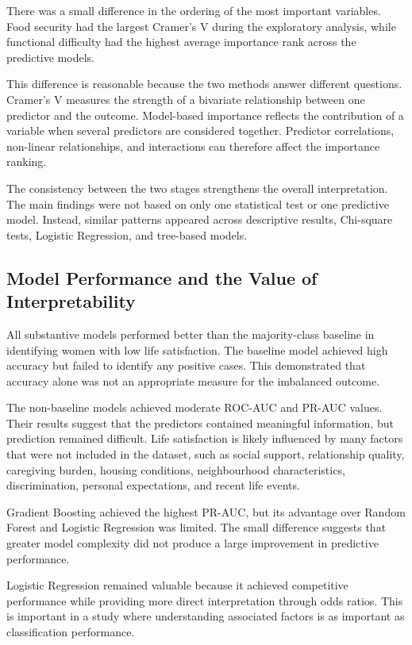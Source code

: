 \documentclass[12pt]{article}
\begin{document}
There was a small difference in the ordering of the most important variables. Food security had the largest Cramer's V during the exploratory analysis, while functional difficulty had the highest average importance rank across the predictive models.

This difference is reasonable because the two methods answer different questions. Cramer's V measures the strength of a bivariate relationship between one predictor and the outcome. Model-based importance reflects the contribution of a variable when several predictors are considered together. Predictor correlations, non-linear relationships, and interactions can therefore affect the importance ranking.

The consistency between the two stages strengthens the overall interpretation. The main findings were not based on only one statistical test or one predictive model. Instead, similar patterns appeared across descriptive results, Chi-square tests, Logistic Regression, and tree-based models.

\subsection{Model Performance and the Value of Interpretability}

All substantive models performed better than the majority-class baseline in identifying women with low life satisfaction. The baseline model achieved high accuracy but failed to identify any positive cases. This demonstrated that accuracy alone was not an appropriate measure for the imbalanced outcome.

The non-baseline models achieved moderate ROC-AUC and PR-AUC values. Their results suggest that the predictors contained meaningful information, but prediction remained difficult. Life satisfaction is likely influenced by many factors that were not included in the dataset, such as social support, relationship quality, caregiving burden, housing conditions, neighbourhood characteristics, discrimination, personal expectations, and recent life events.

Gradient Boosting achieved the highest PR-AUC, but its advantage over Random Forest and Logistic Regression was limited. The small difference suggests that greater model complexity did not produce a large improvement in predictive performance.

Logistic Regression remained valuable because it achieved competitive performance while providing more direct interpretation through odds ratios. This is important in a study where understanding associated factors is as important as classification performance.
\end{document}
